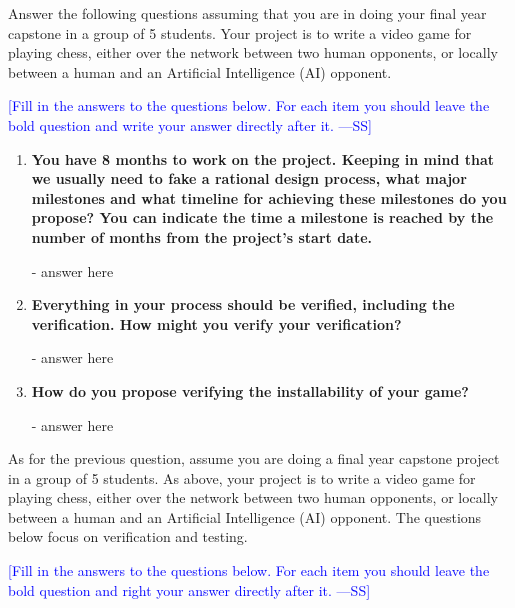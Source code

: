 \documentclass[12pt,fleqn]{examtst}
\newcommand{\authornote}[3]{\textcolor{#1}{[#3 ---#2]}}
\newcommand{\authornote}[3]{}
\newcommand{\wss}[1]{\authornote{blue}{SS}{#1}}
\begin{document}

\newpage

 Answer the following questions assuming that you are in doing
your final year capstone in a group of 5 students.  Your project is to write a
video game for playing chess, either over the network between two human
opponents, or locally between a human and an Artificial Intelligence (AI)
opponent.

\bigskip

\noindent \wss{Fill in the answers to the questions below.  For each item you
  should leave the bold question and write your answer directly after it.}

\begin{enumerate}
  
\item \textbf{You have 8 months to work on the project.  Keeping in mind that we
  usually need to fake a rational design process, what major milestones and what
  timeline for achieving these milestones do you propose?  You can indicate the
  time a milestone is reached by the number of months from the project's start date.}

  - answer here
  
\item \textbf{Everything in your process should be verified, including the
    verification.  How might you verify your verification?}

  - answer here
  
\item \textbf{How do you propose verifying the installability of your game?}

  - answer here
  
\end{enumerate}


\newpage

 As for the previous question, assume you are doing a final
year capstone project in a group of 5 students.  As above, your project
is to write a video game for playing chess, either over the network between two
human opponents, or locally between a human and an Artificial Intelligence
(AI) opponent.  The questions below focus on verification and testing.

\bigskip

\noindent \wss{Fill in the answers to the questions below.  For each item you
  should leave the bold question and right your answer directly after it.}
\end{document}
